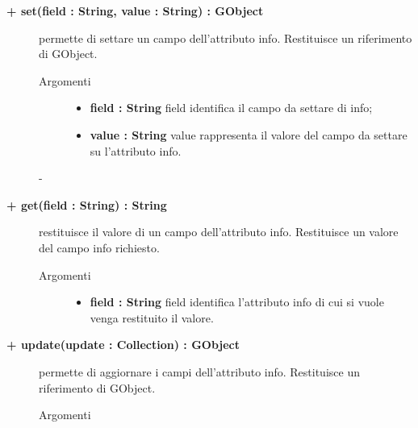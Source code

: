 \begin{description}
	\begin{description}
		\item[\textbf{\color{blue}+ set(field : String, value : String) : GObject			}] \hfill
			permette di settare un campo dell'attributo info. Restituisce un riferimento di GObject.
			
		\begin{description}
			\item[Argomenti] \hfill
				\begin{itemize}
				
					\item \textbf{field : String			} \hfill
					field identifica il campo da settare di info;
					\item \textbf{value : String			} \hfill
					value rappresenta il valore del campo da settare su l'attributo info.
				\end{itemize}
		\end{description}-

\end{description}

\begin{description}
		\item[\textbf{\color{blue}+ get(field : String) : String			}] \hfill
			restituisce il valore di un campo dell'attributo info. Restituisce un valore del campo info richiesto.
			
		\begin{description}
			\item[Argomenti] \hfill
				\begin{itemize}
				
					\item \textbf{field : String			} \hfill
					field identifica l'attributo info di cui si vuole venga restituito il valore.
				\end{itemize}
		\end{description}

\end{description}

\begin{description}
		\item[\textbf{\color{blue}+ update(update : Collection) : GObject			}] \hfill
			permette di aggiornare i campi dell'attributo info. Restituisce un riferimento di GObject.
			
		\begin{description}
			\item[Argomenti] \hfill
				\begin{itemize}
				

\end{itemize}
\end{description}
\end{description}
\end{description}
